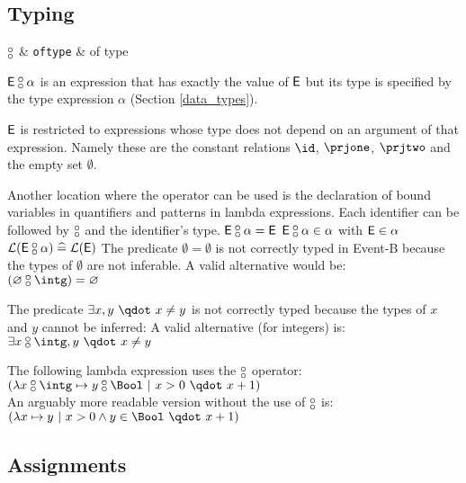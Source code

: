 \begin{samepage}
\subsection{Typing}
\label{typing}
\begin{rrnames}
  $\boftype$      & \texttt{oftype}   & of type
\end{rrnames}
\begin{rodinrefentry}
  \rrdesc
    $\expre\boftype \alpha$ is an expression that has exactly the value of $\textsf{E}$ but its
    type is specified by the type expression $\alpha$ (Section \ref{data_types}).

    $\mathsf{\textsf{E}}$ is restricted to expressions whose type does not depend on an argument of that expression.
    Namely these are the constant relations $\id$, $\prjone$, $\prjtwo$ and the empty set $\emptyset$.

    Another location where the operator can be used is the declaration of bound variables 
    in quantifiers and patterns in lambda expressions.
    Each identifier can be followed by $\boftype$ and the identifier's type.
  \rrdef
    $\expre\boftype\alpha = \expre$
  \rrtypes
    $\expre\boftype\alpha\in\alpha$ with $\textsf{E}\in\alpha$
  \rrwd
    $\wdl(\expre\boftype\alpha) \defi \wdl(\expre)$
  \rrex
    The predicate $\emptyset=\emptyset$ is not correctly typed in Event-B because the types
    of $\emptyset$ are not inferable. A valid alternative would be:\\
    $(\emptyset\boftype\intg) = \emptyset$

    The predicate $\exists x,y ~\qdot~ x\neq y$ is not correctly typed because the types of $x$ and $y$
    cannot be inferred: A valid alternative (for integers) is:\\
    $\exists x\boftype\intg,y ~\qdot~ x\neq y$

    The following lambda expression uses the $\boftype$ operator:\\
    $(\lambda x\boftype \intg\mapsto y\boftype\Bool ~|~ x>0 ~\qdot~ x+1)$\\
    An arguably more readable version without the use of $\boftype$ is:\\
    $(\lambda x\mapsto y ~|~ x>0 \land y\in\Bool ~\qdot~ x+1)$
\end{rodinrefentry}
\end{samepage}


\subsection{Assignments}
\label{assignments}

